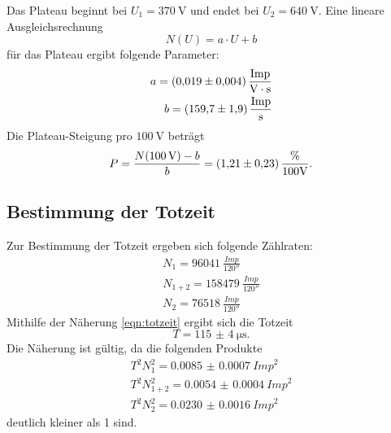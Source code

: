 Das Plateau beginnt bei $U_1 = \SI{370}{\volt}$ und endet bei $U_2 = \SI{640}{\volt}$.
Eine lineare Ausgleichsrechnung
\begin{equation}
    N(U) = a \cdot U + b
\end{equation}
für das Plateau ergibt folgende Parameter:
\begin{align*}
    a = \SI{0.019(4)}{\frac{Imp}{\volt \cdot \second}} \\
    b = \SI{159.7(19)}{\frac{Imp}{s}}
\end{align*}
Die Plateau-Steigung pro $\SI{100}{\volt}$ beträgt
\begin{equation}
    P = \frac{N(\SI{100}{\volt}) - b}{b} = \SI{1.21(23)}{\frac{\percent}{100 \volt}} .
    \label{eqn:plateau_steigung}
\end{equation}

\subsection{Bestimmung der Totzeit}
Zur Bestimmung der Totzeit ergeben sich folgende Zählraten:
\begin{align*}
    N_1 = \SI{96041}{\frac{Imp}{120 \second}} \\
    N_{1+2} = \SI{158479}{\frac{Imp}{120 \second}} \\
    N_2 = \SI{76518}{\frac{Imp}{120 \second}}
\end{align*}
Mithilfe der Näherung \eqref{eqn:totzeit} ergibt sich die Totzeit
\begin{equation}
    T = \SI{115(4)}{\micro\second} .
\end{equation}
Die Näherung ist gültig, da die folgenden Produkte
\begin{align*}
    T^2 N_1^2 = \SI{0.0085(7)}{{Imp}^2} \\
    T^2 N_{1+2}^2 = \SI{0.0054(4)}{{Imp}^2} \\
    T^2 N_2^2 = \SI{0.0230(16)}{{Imp}^2}
\end{align*}
deutlich kleiner als 1 sind.

